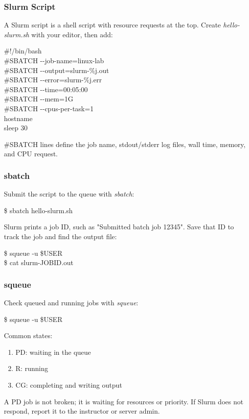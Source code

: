 \documentclass{beamer}
\begin{document}
	\begin{frame}
		\frametitle{Slurm Script}
		A Slurm script is a shell script with resource requests at the top. Create \textit{hello-slurm.sh} with your editor, then add:
		\begin{example}
			\#!/bin/bash \\
			\#SBATCH -{}-job-name=linux-lab \\
			\#SBATCH -{}-output=slurm-\%j.out \\
			\#SBATCH -{}-error=slurm-\%j.err \\
			\#SBATCH -{}-time=00:05:00 \\
			\#SBATCH -{}-mem=1G \\
			\#SBATCH -{}-cpus-per-task=1 \\
			hostname \\
			sleep 30
		\end{example}

		\#SBATCH lines define the job name, stdout/stderr log files, wall time, memory, and CPU request.
	\end{frame}

	\begin{frame}
		\frametitle{sbatch}
		Submit the script to the queue with \textit{sbatch}:
		\begin{example}
			\$ sbatch hello-slurm.sh
		\end{example}

		Slurm prints a job ID, such as "Submitted batch job 12345". Save that ID to track the job and find the output file:
		\begin{example}
			\$ squeue -u \$USER \\
			\$ cat slurm-JOBID.out
		\end{example}
	\end{frame}

	\begin{frame}
		\frametitle{squeue}
		Check queued and running jobs with \textit{squeue}:
		\begin{example}
			\$ squeue -u \$USER
		\end{example}

		Common states:
		\begin{enumerate}
			\item PD: waiting in the queue
			\item R: running
			\item CG: completing and writing output
		\end{enumerate}
		A PD job is not broken; it is waiting for resources or priority. If Slurm does not respond, report it to the instructor or server admin.
	\end{frame}
\end{document}
